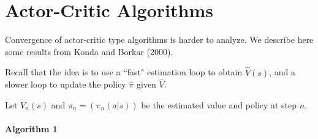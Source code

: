 \section{Actor-Critic Algorithms}

Convergence of actor-critic type algorithms is harder to analyze. We describe here some results from
Konda and Borkar (2000).

Recall that the idea is to use a ``fast" estimation loop to obtain $\hat V(s)$,
and a slower loop to update
the policy $\hat \pi$ given $\hat V$.

Let $V_n(s)$ and $\pi_n=(\pi_n(a|s))$ be the estimated value and policy at step
$n$.

\paragraph{Algorithm 1}

